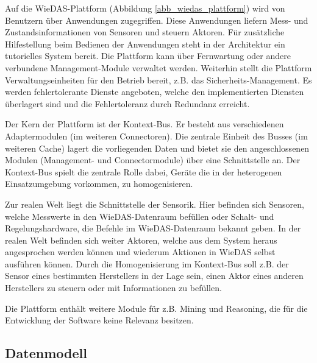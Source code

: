 Auf die WieDAS-Plattform (Abbildung \ref{abb_wiedas_plattform}) wird von Benutzern über Anwendungen zugegriffen.
Diese Anwendungen liefern Mess- und Zustandsinformationen von Sensoren und steuern Aktoren.
Für zusätzliche Hilfestellung beim Bedienen der Anwendungen steht in der Architektur ein
tutorielles System bereit.
Die Plattform kann über Fernwartung oder andere verbundene Management-Module verwaltet werden.
Weiterhin stellt die Plattform Verwaltungseinheiten für den Betrieb bereit, z.B. das Sicherheits-Management.
Es werden fehlertolerante Dienste angeboten, welche den implementierten Diensten überlagert sind und die
Fehlertoleranz durch Redundanz erreicht.

Der Kern der Plattform ist der Kontext-Bus.
Er besteht aus verschiedenen Adaptermodulen (im weiteren Connectoren).
Die zentrale Einheit des Busses (im weiteren Cache) lagert die vorliegenden Daten und bietet sie
den angeschlossenen Modulen (Management- und Connectormodule) über eine Schnittstelle an.
Der Kontext-Bus spielt die zentrale Rolle dabei, Geräte die in der heterogenen Einsatzumgebung vorkommen, zu
homogenisieren.

Zur realen Welt liegt die Schnittstelle der Sensorik.
Hier befinden sich Sensoren, welche Messwerte \cite[Plattform]{wiedas} in den WieDAS-Datenraum befüllen oder
Schalt- und Regelungshardware, die Befehle im WieDAS-Datenraum bekannt geben.
In der realen Welt befinden sich weiter Aktoren, welche aus dem System heraus angesprochen werden können
und wiederum Aktionen in WieDAS selbst ausführen können.
Durch die Homogenisierung im Kontext-Bus soll z.B. der Sensor eines bestimmten Herstellers in der
Lage sein, einen Aktor eines anderen Herstellers zu steuern oder mit Informationen zu befüllen.

Die Plattform enthält weitere Module für z.B. Mining und Reasoning, die für die Entwicklung
der Software keine Relevanz besitzen.

\subsection{Datenmodell}
\label{gru_wiedas_daten}

